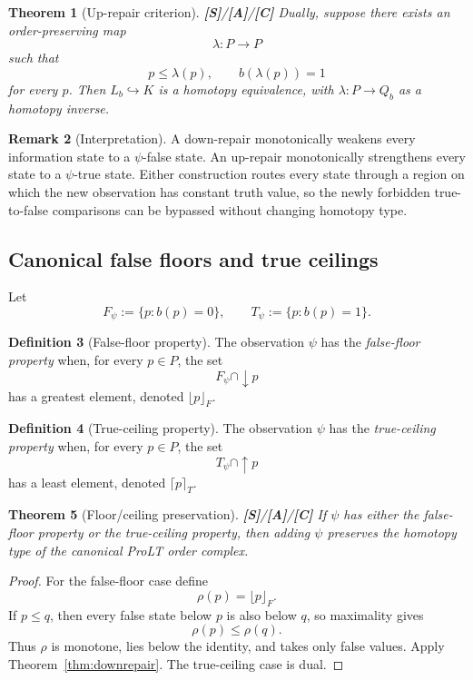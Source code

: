 \documentclass[11pt]{article}
\newtheorem{theorem}{Theorem}[section]
\theoremstyle{definition}
\newtheorem{definition}[theorem]{Definition}
\newtheorem{remark}[theorem]{Remark}
\newcommand{\statusS}{\textbf{[S]}}
\newcommand{\statusA}{\textbf{[A]}}
\newcommand{\statusC}{\textbf{[C]}}
\begin{document}
\begin{theorem}[Up-repair criterion]\label{thm:uprepair}
\statusS/\statusA/\statusC\;
Dually, suppose there exists an order-preserving map
\[
\lambda:P\longrightarrow P
\]
such that
\[
p\le\lambda(p),
\qquad
b(\lambda(p))=1
\]
for every $p$. Then $L_b\hookrightarrow K$ is a homotopy equivalence, with $\lambda:P\to Q_b$ as a homotopy inverse.
\end{theorem}

\begin{remark}[Interpretation]
A down-repair monotonically weakens every information state to a $\psi$-false state. An up-repair monotonically strengthens every state to a $\psi$-true state. Either construction routes every state through a region on which the new observation has constant truth value, so the newly forbidden true-to-false comparisons can be bypassed without changing homotopy type.
\end{remark}

\subsection{Canonical false floors and true ceilings}

Let
\[
F_\psi:=\{p:b(p)=0\},
\qquad
T_\psi:=\{p:b(p)=1\}.
\]

\begin{definition}[False-floor property]
The observation $\psi$ has the \emph{false-floor property} when, for every $p\in P$, the set
\[
F_\psi\cap\downarrow p
\]
has a greatest element, denoted $\lfloor p\rfloor_F$.
\end{definition}

\begin{definition}[True-ceiling property]
The observation $\psi$ has the \emph{true-ceiling property} when, for every $p\in P$, the set
\[
T_\psi\cap\uparrow p
\]
has a least element, denoted $\lceil p\rceil_T$.
\end{definition}

\begin{theorem}[Floor/ceiling preservation]\label{thm:floorceil}
\statusS/\statusA/\statusC\;
If $\psi$ has either the false-floor property or the true-ceiling property, then adding $\psi$ preserves the homotopy type of the canonical ProLT order complex.
\end{theorem}

\begin{proof}
For the false-floor case define
\[
\rho(p)=\lfloor p\rfloor_F.
\]
If $p\le q$, then every false state below $p$ is also below $q$, so maximality gives
\[
\rho(p)\le\rho(q).
\]
Thus $\rho$ is monotone, lies below the identity, and takes only false values. Apply Theorem~\ref{thm:downrepair}. The true-ceiling case is dual.
\end{proof}
\end{document}
